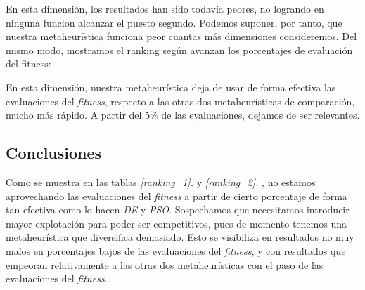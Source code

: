 \documentclass[11pt]{article}
\begin{document}
En esta dimensión, los resultados han sido todavía peores, no logrando en ninguna funcion alcanzar el puesto segundo. Podemos suponer, por tanto, que nuestra metaheurística funciona peor cuantas más dimensiones consideremos. Del mismo modo, mostramos el ranking según avanzan los porcentajes de evaluación del fitness:


\begin{table}[H]
\centering
{}
    \caption{Ranking según el avance del porcentaje de evaluaciones consumidas}
    \label{ranking_2}
\end{table}

En esta dimensión, nuestra metaheurística deja de usar de forma efectiva las evaluaciones del \emph{fitness}, respecto a las otras dos metaheurísticas de comparación, mucho más rápido. A partir del 5\% de las evaluaciones, dejamos de ser relevantes.

\subsection{Conclusiones}

Como se muestra en las tablas \emph{\ref{ranking_1}. } y \emph{\ref{ranking_2}. }, no estamos aprovechando las evaluaciones del \emph{fitness} a partir de cierto porcentaje de forma tan efectiva como lo hacen \emph{DE} y \emph{PSO}. Sospechamos que necesitamos introducir mayor explotación para poder ser competitivos, pues de momento tenemos una metaheurística que diversifica demasiado. Esto se visibiliza en resultados no muy malos en porcentajes bajos de las evaluaciones del \emph{fitness}, y con resultados que empeoran relativamente a las otras dos metaheurísticas con el paso de las evaluaciones del \emph{fitness}.
\end{document}
